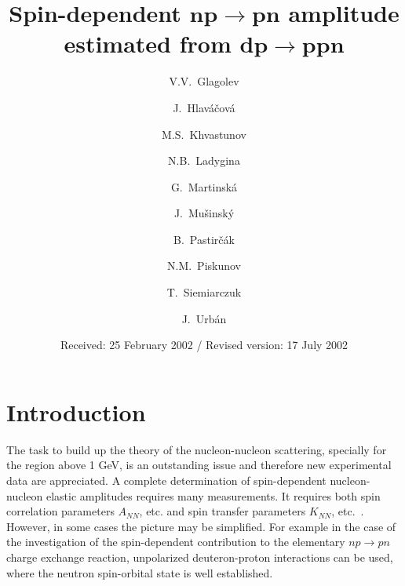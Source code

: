 \documentclass[epj]{svjour}
\begin{document}
\title{Spin-dependent $\boldsymbol{np \rightarrow pn}$ amplitude estimated from
  $\boldsymbol{dp \rightarrow ppn}$}
\author{
  V.V.~Glagolev        \and J.~Hlav\'{a}\v{c}ov\'{a} \and
  M.S.~Khvastunov      \and N.B.~Ladygina            \and
  G.~Martinsk\'{a}     \and J.~Mu\v{s}insk\'{y}    \and
  B.~Pastir\v{c}\'{a}k \and N.M.~Piskunov            \and
  T.~Siemiarczuk       \and J.~Urb\'{a}n
}
\date{Received: 25 February 2002 / Revised version: 17 July 2002}
\maketitle

\section{Introduction}
The task to build up the theory of the nucleon-nucleon scattering, specially for
the region above 1 GeV, is an outstanding issue and therefore new experimental
data are appreciated. A complete determination of spin-dependent nucleon-nucleon
elastic amplitudes requires many measurements. It requires both spin correlation
parameters $A_{NN}$, etc. and spin transfer parameters $K_{NN}$,
etc.~\cite{Bil}. However, in some cases the picture may be simplified. For
example in the case of the investigation of the spin-dependent contribution to
the elementary $np\to pn$ charge exchange reaction, unpolarized deuteron-proton
interactions can be used, where the neutron spin-orbital state is well
established.
\end{document}
